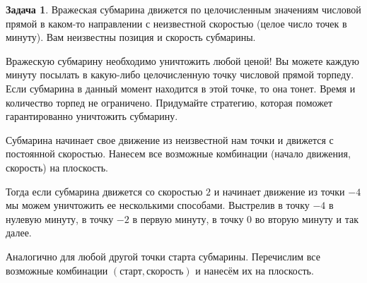 \documentclass[pdftex, 12pt, a4paper]{article}
\theoremstyle{definition} %
\newtheorem{problem}{Задача}
\numberwithin{problem}{section}
\numberwithin{blits}{section}
\begin{document}
\begin{problem}
Вражеская субмарина движется по целочисленным значениям числовой прямой в каком-то направлении с неизвестной скоростью (целое число точек в минуту). Вам неизвестны позиция и скорость субмарины.

Вражескую субмарину необходимо уничтожить любой ценой! Вы можете каждую минуту посылать в какую-либо целочисленную точку числовой прямой торпеду. Если субмарина в данный момент находится в этой точке, то она тонет. Время и количество торпед не ограничено. Придумайте стратегию, которая поможет гарантированно уничтожить субмарину.
\begin{sol}
Субмарина начинает свое движение из неизвестной нам точки и движется с постоянной скоростью. Нанесем все возможные комбинации (начало движения, скорость) на плоскость.

Тогда если субмарина движется со скоростью $2$ и начинает движение из точки $-4$ мы можем уничтожить ее несколькими способами. Выстрелив в точку $-4$  в нулевую минуту, в точку $-2$ в первую минуту, в точку $0$ во вторую минуту и так далее.

Аналогично для любой другой точки старта субмарины. Перечислим все возможные комбинации $(\text{старт},\text{скорость})$ и нанесём их на плоскость.


\end{sol}
\end{problem}
\end{document}
